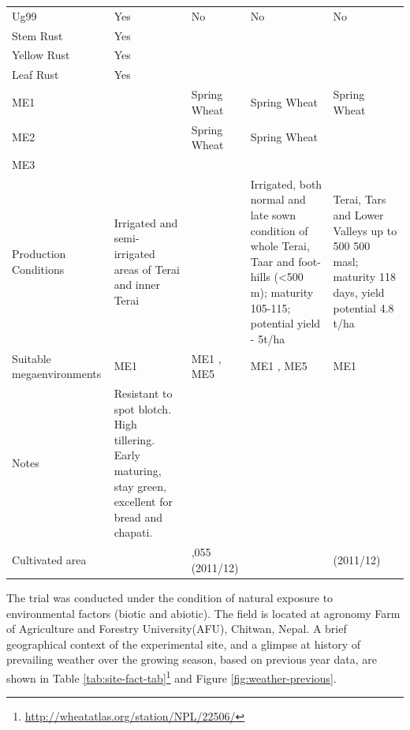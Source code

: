 \documentclass[12pt,oneside]{dukestatscithesis} %
\theoremstyle{definition}
\theoremstyle{definition}
\theoremstyle{definition}
\theoremstyle{remark}
\begin{document}
\begin{longtable}[t]{>{\centering\arraybackslash}p{2.0cm}>{\centering\arraybackslash}p{3.2cm}>{\centering\arraybackslash}p{3.2cm}>{\centering\arraybackslash}p{3.2cm}>{\centering\arraybackslash}p{3.2cm}}
Ug99 & Yes & No & No & No\\
Stem Rust & Yes &  &  & \\
Yellow Rust & Yes &  &  & \\
Leaf Rust & Yes &  &  & \\
\addlinespace
ME1 &  & Spring Wheat & Spring Wheat & Spring Wheat\\
ME2 &  & Spring Wheat & Spring Wheat & \\
ME3 &  &  &  & \\
Production Conditions & Irrigated and semi-irrigated areas of Terai and inner Terai &  & Irrigated, both normal and late sown condition of whole Terai, Taar and foot-hills (<500 m); maturity 105-115; potential yield - 5t/ha & Terai, Tars and Lower Valleys up to 500 500 masl; maturity 118 days, yield potential 4.8 t/ha\\
Suitable megaenvironments & ME1 & ME1 , ME5 & ME1 , ME5 & ME1\\
\addlinespace
Notes & Resistant to spot blotch. High tillering. Early maturing, stay green, excellent for bread and chapati. &  &  & \\
Cultivated area &  & 153,055 (2011/12) &  & 38263 (2011/12)\\
\bottomrule
\end{longtable}
\endgroup{}

The trial was conducted under the condition of natural exposure to
environmental factors (biotic and abiotic). The field is located at
agronomy Farm of Agriculture and Forestry University(AFU), Chitwan,
Nepal. A brief geographical context of the experimental site, and a
glimpse at history of prevailing weather over the growing season, based
on previous year data, are shown in Table
\ref{tab:site-fact-tab}\footnote{\url{http://wheatatlas.org/station/NPL/22506/}}
and Figure \ref{fig:weather-previous}.
\end{document}
